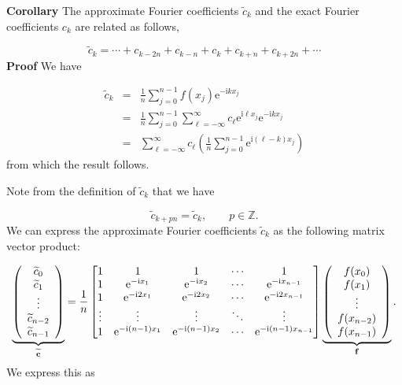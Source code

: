 \documentclass[12pt,landscape]{article}
\begin{document}
{\textbf{Corollary} The approximate Fourier coefficients $\widetilde{c}_k$ and the exact Fourier coefficients $c_k$ are related as follows,

\[
\widetilde{c}_k = \cdots + c_{k-2n} + c_{k-n} +  c_k +  c_{k+n} + c_{k+2n} + \cdots
\]
\textbf{Proof}  We have


\begin{eqnarray*}
  \widetilde{c}_k   &=&\frac{1}{n}\sum_{j = 0}^{n-1} f(x_j)\mathrm{e}^{-\mathrm{i}kx_j}   \\
    & = & \frac{1}{n}\sum_{j = 0}^{n-1} \sum_{\ell=-\infty}^{\infty} c_{\ell}\mathrm{e}^{\mathrm{i}\ell x_j} \mathrm{e}^{-\mathrm{i}kx_j}  \\
    &=& \sum_{\ell=-\infty}^{\infty}c_{\ell}\left(\frac{1}{n}\sum_{j = 0}^{n-1} \mathrm{e}^{\mathrm{i}(\ell-k) x_j}   \right)
\end{eqnarray*}
from which the result follows.

Note from the definition of $\widetilde{c}_{k}$ that we have

\[
\widetilde{c}_{k+pn} = \widetilde{c}_{k}, \qquad p \in \mathbb{Z}.  
\]
We can express the approximate Fourier coefficients $\widetilde{c}_k$ as the following matrix vector product:

\[
\underbrace{\left(
\begin{array}{c}
\widetilde{c}_0 \\
\widetilde{c}_1 \\
\vdots \\
\widetilde{c}_{n-2} \\
\widetilde{c}_{n-1}
\end{array}
\right)}_{\widetilde{\mathbf{c}}} = 
{1 \over n} \begin{bmatrix} 1 & 1 & 1&  \ensuremath{\cdots} & 1 \\
                                    1 & {\rm e}^{-{\rm i} x_1} & {\rm e}^{-{\rm i} x_2} & \ensuremath{\cdots} & {\rm e}^{-{\rm i} x_{n-1}} \\
                                    1 & {\rm e}^{-{\rm i} 2 x_1} & {\rm e}^{-{\rm i} 2 x_2} & \ensuremath{\cdots} & {\rm e}^{-{\rm i} 2x_{n-1}} \\
                                    \ensuremath{\vdots} & \ensuremath{\vdots} & \ensuremath{\vdots} & \ensuremath{\ddots} & \ensuremath{\vdots} \\
                                    1 & {\rm e}^{-{\rm i} (n-1) x_1} & {\rm e}^{-{\rm i} (n-1) x_2} & \ensuremath{\cdots} & {\rm e}^{-{\rm i} (n-1) x_{n-1}}
\end{bmatrix} 
\underbrace{\left(
\begin{array}{c}
f(x_0) \\
f(x_1) \\
\vdots \\
f(x_{n-2}) \\
f(x_{n-1})
\end{array}
\right)}_{\mathbf{f}}.
\]
We express this as

}
\end{document}
